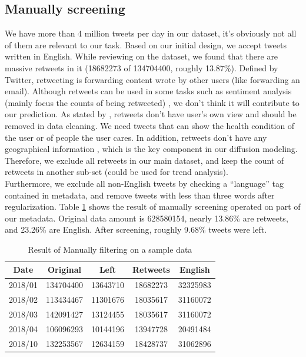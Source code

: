 \subsection{Manually screening}
\label{sec:Manually screening}
We have more than 4 million tweets per day in our dataset, it's obviously not all of them are relevant to our task. Based on our initial design, we accept tweets written in English. While reviewing on the dataset, we found that there are massive retweets in it (18682273 of 134704400, roughly 13.87\%). Defined by Twitter\cite{twitter_dev}, retweeting is forwarding content wrote by other users (like forwarding an email). Although retweets can be used in some tasks such as sentiment analysis (mainly focus the counts of being retweeted) \cite{perdana2018combining}, we don't think it will contribute to our prediction. As stated by \cite{kim2016competitive}, retweets don't have user's own view and should be removed in data cleaning. We need tweets that can show the health condition of the user or of people the user cares. In addition, retweets don't have any geographical information \cite{twitter_dev}, which is the key component in our diffusion modeling. Therefore, we exclude all retweets in our main dataset, and keep the count of retweets in another sub-set (could be used for trend analysis).\\ Furthermore, we exclude all non-English tweets by checking a ``language'' tag contained in metadata, and remove tweets with less than three words after regularization. Table \ref{tab:manual} shows the result of manually screening operated on part of our metadata. Original data amount is 628580154, nearly 13.86\% are retweets, and 23.26\% are English. After screening, roughly 9.68\% tweets were left.
\begin{table}[!htbp]
    \centering
    \hspace{0.5cm}
    \begin{tabular}{ccccc}
        Date & Original & Left & Retweets & English\\ \hline
        2018/01 &134704400 & 13643710 & 18682273 & 32325983 \\ \hline
        2018/02 &113434467 & 11301676 & 18035617 & 31160072 \\ \hline
        2018/03 & 142091427 & 13124455 & 18035617 & 31160072 \\ \hline
        2018/04 & 106096293 & 10144196 & 13947728 & 20491484 \\ \hline
        2018/10 & 132253567 & 12634159 & 18428737 & 31062896 \\\hline
    \end{tabular}
    \caption{Result of Manually filtering on a sample data}
    \label{tab:manual}
\end{table}

